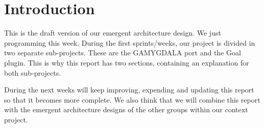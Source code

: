 \section{Introduction}
This is the draft version of our emergent architecture design. We just programming this week. During the first sprints/weeks, our project is divided in two separate sub-projects. These are the GAMYGDALA port and the Goal plugin. This is why this report has two sections, containing an explanation for both sub-projects. \\ \par
During the next weeks will keep improving, expending and updating this report so that it becomes more complete. We also think that we will combine this report with the emergent architecture designs of the other groups within our context project.